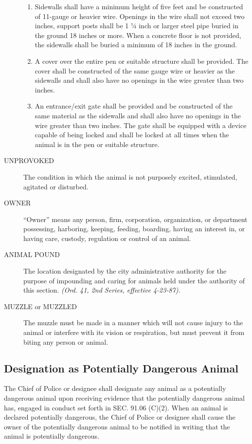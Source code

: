 \begin{description}
\begin{enumerate}
\item Sidewalls shall have a minimum height of five feet and be constructed of 11-gauge or heavier wire.  Openings in the wire shall not exceed two inches, support posts shall be 1 ¼ inch or larger steel pipe buried in the ground 18 inches or more.  When a concrete floor is not provided, the sidewalls shall be buried a minimum of 18 inches in the ground.
\item A cover over the entire pen or suitable structure shall be provided.  The cover shall be constructed of the same gauge wire or heavier as the sidewalls and shall also have no openings in the wire greater than two inches.
\item An entrance/exit gate shall be provided and be constructed of the same material as the sidewalls and shall also have no openings in the wire greater than two inches.  The gate shall be equipped with a device capable of being locked and shall be locked at all times when the animal is in the pen or suitable structure.
\end{enumerate}
\item[UNPROVOKED] The condition in which the animal is not purposely excited, stimulated, agitated or disturbed.
\item[OWNER] “Owner” means any person, firm, corporation, organization, or department possessing, harboring, keeping, feeding, boarding, having an interest in, or having care, custody, regulation or control of an animal.
\item[ANIMAL POUND] The location designated by the city administrative authority for the purpose of impounding and caring for animals held under the authority of this section.  \emph{(Ord. 41, 2nd Series, effective 4-23-87).}
\item[MUZZLE or MUZZLED] The muzzle must be made in a manner which will not cause injury to the animal or interfere with its vision or respiration, but must prevent it from biting any person or animal.
\end{description}
\subsection{Designation as Potentially Dangerous Animal}
The Chief of Police or designee shall designate any animal as a potentially dangerous animal upon receiving evidence that the potentially dangerous animal has, engaged in conduct set forth in SEC. 91.06 (C)(2).  When an animal is declared potentially dangerous, the Chief of Police or designee shall cause the owner of the potentially dangerous animal to be notified in writing that the animal is potentially dangerous.
